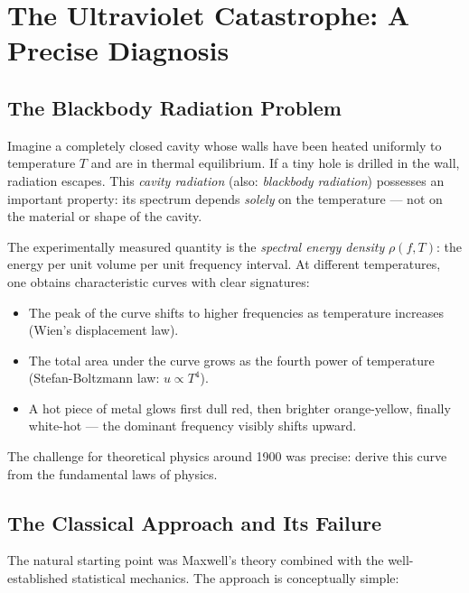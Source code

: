 \clearpage

\section{The Ultraviolet Catastrophe: A Precise Diagnosis}
\label{sec:uv_catastrophe}

\subsection{The Blackbody Radiation Problem}

Imagine a completely closed cavity whose walls have been heated uniformly to 
temperature $T$ and are in thermal equilibrium. If a tiny hole is drilled in the 
wall, radiation escapes. This \emph{cavity radiation} (also: \emph{blackbody 
radiation}) possesses an important property: its spectrum depends \emph{solely} on 
the temperature — not on the material or shape of the cavity.

The experimentally measured quantity is the \emph{spectral energy density} $\rho(f, T)$: 
the energy per unit volume per unit frequency interval. At different temperatures, 
one obtains characteristic curves with clear signatures:
\begin{itemize}
    \item The peak of the curve shifts to higher frequencies as temperature increases 
    (Wien's displacement law).
    \item The total area under the curve grows as the fourth power of temperature 
    (Stefan-Boltzmann law: $u \propto T^4$).
    \item A hot piece of metal glows first dull red, then brighter orange-yellow, 
    finally white-hot — the dominant frequency visibly shifts upward.
\end{itemize}

The challenge for theoretical physics around 1900 was precise: derive this curve 
from the fundamental laws of physics.

\subsection{The Classical Approach and Its Failure}

The natural starting point was Maxwell's theory combined with the well-established 
statistical mechanics. The approach is conceptually simple:

